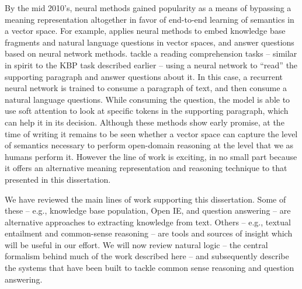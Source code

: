 By the mid 2010's, neural methods gained popularity as a means of bypassing a meaning representation
  altogether in favor of end-to-end learning of semantics in a vector space.
For example,  applies neural methods
  to embed knowledge base fragments and natural language questions in vector spaces,
   and answer questions based on neural network methods.
 tackle a reading comprehension tasks -- similar in spirit
  to the KBP task described earlier -- using a neural network to ``read'' the supporting
  paragraph and answer questions about it.
In this case, a recurrent neural network is trained to consume a paragraph of text, and then
  consume a natural language questions.
While consuming the question, the model is able to use soft attention to look at specific tokens
  in the supporting paragraph, which can help it in its decision.
Although these methods show early promise, at the time of writing it remains to be seen
  whether a vector space can capture the level of semantics necessary to perform
  open-domain reasoning at the level that we as humans perform it.
However the line of work is exciting, in no small part because it offers an alternative
  meaning representation and reasoning technique to that presented in this dissertation.


We have reviewed the main lines of work supporting this dissertation.
Some of these -- e.g., knowledge base population, Open IE, and question answering -- are 
  alternative approaches to extracting knowledge from text.
Others -- e.g., textual entailment and common-sense reasoning -- are tools and sources of insight
  which will be useful in our effort.
We will now review natural logic -- the central formalism behind much of the work described here --
  and subsequently describe the systems that have been built to tackle common sense reasoning and
  question answering.
